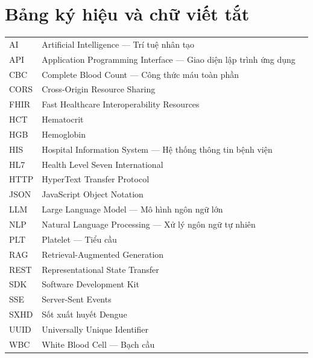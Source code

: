\documentclass[a4paper,13pt,3p,oneside]{report}
\theoremstyle{definition}
\theoremstyle{remark}
\theoremstyle{definition}
\begin{document}
\tableofcontents
\thispagestyle{empty}
\cleardoublepage

\renewcommand{\listfigurename}{DANH MỤC HÌNH VẼ}
{\let\oldnumberline\numberline
\renewcommand{\numberline}{Hình~\oldnumberline}
\listoffigures}
\newpage

\renewcommand{\listtablename}{DANH MỤC BẢNG BIỂU}
{\let\oldnumberline\numberline
\renewcommand{\numberline}{Bảng~\oldnumberline}
\listoftables}

\chapter*{Bảng ký hiệu và chữ viết tắt}

\begin{tabular}{@{\hspace{-0.1cm}} l @{\hspace{1.2cm}} p{11.5cm} l}
AI    & Artificial Intelligence --- Trí tuệ nhân tạo \\
API   & Application Programming Interface --- Giao diện lập trình ứng dụng \\
CBC   & Complete Blood Count --- Công thức máu toàn phần \\
CORS  & Cross-Origin Resource Sharing \\
FHIR  & Fast Healthcare Interoperability Resources \\
HCT   & Hematocrit \\
HGB   & Hemoglobin \\
HIS   & Hospital Information System --- Hệ thống thông tin bệnh viện \\
HL7   & Health Level Seven International \\
HTTP  & HyperText Transfer Protocol \\
JSON  & JavaScript Object Notation \\
LLM   & Large Language Model --- Mô hình ngôn ngữ lớn \\
NLP   & Natural Language Processing --- Xử lý ngôn ngữ tự nhiên \\
PLT   & Platelet --- Tiểu cầu \\
RAG   & Retrieval-Augmented Generation \\
REST  & Representational State Transfer \\
SDK   & Software Development Kit \\
SSE   & Server-Sent Events \\
SXHD  & Sốt xuất huyết Dengue \\
UUID  & Universally Unique Identifier \\
WBC   & White Blood Cell --- Bạch cầu \\
\end{tabular}
\end{document}

